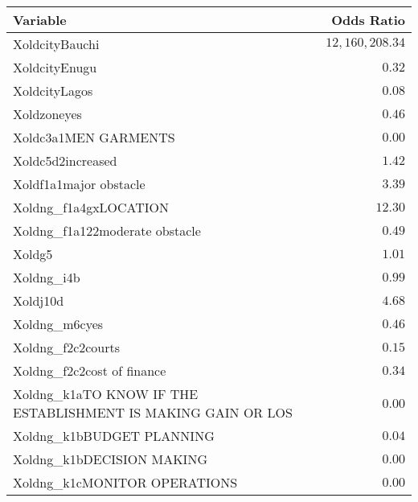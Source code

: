 \begin{longtable}{lr}
\toprule
Variable & Odds Ratio \\ 
\midrule
XoldcityBauchi & $12,160,208.34$ \\ 
XoldcityEnugu & $0.32$ \\ 
XoldcityLagos & $0.08$ \\ 
Xoldzoneyes & $0.46$ \\ 
Xoldc3a1MEN GARMENTS & $0.00$ \\ 
Xoldc5d2increased & $1.42$ \\ 
Xoldf1a1major obstacle & $3.39$ \\ 
Xoldng\_f1a4gxLOCATION & $12.30$ \\ 
Xoldng\_f1a122moderate obstacle & $0.49$ \\ 
Xoldg5 & $1.01$ \\ 
Xoldng\_i4b & $0.99$ \\ 
Xoldj10d & $4.68$ \\ 
Xoldng\_m6cyes & $0.46$ \\ 
Xoldng\_f2c2courts & $0.15$ \\ 
Xoldng\_f2c2cost of finance & $0.34$ \\ 
Xoldng\_k1aTO KNOW IF THE ESTABLISHMENT IS MAKING GAIN OR LOS & $0.00$ \\ 
Xoldng\_k1bBUDGET PLANNING & $0.04$ \\ 
Xoldng\_k1bDECISION MAKING & $0.00$ \\ 
Xoldng\_k1cMONITOR OPERATIONS & $0.00$ \\ 
\bottomrule
\end{longtable}

